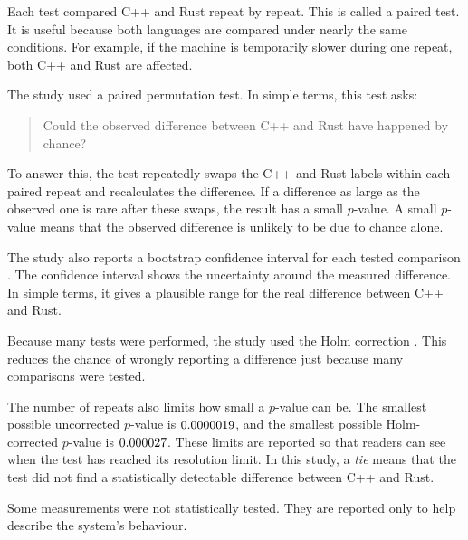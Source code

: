 \documentclass[english,oneside,a4paper,censored,csm,software-track-2020]{HYthesisML}
\begin{document}
Each test compared C++ and Rust repeat by repeat. This is called a paired test. It is
useful because both languages are compared under nearly the same conditions. For example,
if the machine is temporarily slower during one repeat, both C++ and Rust are affected.

The study used a paired permutation test. In simple terms, this test asks:

\begin{quote}
Could the observed difference between C++ and Rust have happened by chance?
\end{quote}

To answer this, the test repeatedly swaps the C++ and Rust labels within each paired
repeat and recalculates the difference. If a difference as large as the observed one is
rare after these swaps, the result has a small $p$-value. A small $p$-value means that
the observed difference is unlikely to be due to chance alone.

The study also reports a bootstrap confidence interval for each tested comparison
\cite{efron1993bootstrap}. The confidence interval shows the uncertainty around the
measured difference. In simple terms, it gives a plausible range for the real difference
between C++ and Rust.

Because many tests were performed, the study used the Holm correction
\cite{holm1979simple}. This reduces the chance of wrongly reporting a difference just
because many comparisons were tested.

The number of repeats also limits how small a $p$-value can be. The smallest possible
uncorrected $p$-value is $0.0000019$, and the smallest possible Holm-corrected
$p$-value is $0.000027$. These limits are reported so that readers can see when
the test has reached its resolution limit. In this study, a \emph{tie} means that the
test did not find a statistically detectable difference between C++ and Rust.

Some measurements were not statistically tested. They are reported only to help describe
the system's behaviour.
\end{document}
